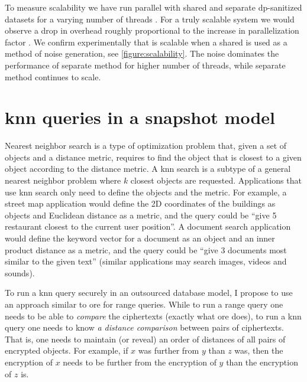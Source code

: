 				To measure scalability we have run parallel \epsolute{} with shared and separate \acrshort{dp}-sanitized datasets \serverDS{} for a varying number of threads \oramsNumber{}.
				For a truly scalable system we would observe a drop in overhead roughly proportional to the increase in parallelization factor \oramsNumber{}.
				We confirm experimentally that \epsolute{} is scalable when a shared \serverDS{} is used as a method of noise generation, see \cref{figure:scalability}.
				The noise dominates the performance of separate \serverDS{} method for higher number of threads, while separate \serverDS{} method continues to scale.

				

	\section{\acrshort{knn} queries in a snapshot model}

		Nearest neighbor search is a type of optimization problem that, given a set of objects and a distance metric, requires to find the object that is closest to a given object according to the distance metric.
		A \acrfull{knn} search is a subtype of a general nearest neighbor problem where $k$ closest objects are requested.
		Applications that use \acrshort{knn} search only need to define the objects and the metric.
		For example, a street map application would define the 2D coordinates of the buildings as objects and Euclidean distance as a metric, and the query could be ``give 5 restaurant closest to the current user position''.
		A document search application would define the keyword vector for a document as an object and an inner product distance as a metric, and the query could be ``give 3 documents most similar to the given text'' (similar applications may search images, videos and sounds).

		To run a \acrshort{knn} query securely in an outsourced database model, I propose to use an approach similar to \acrshort{ore} for range queries.
		While to run a range query one needs to be able to \emph{compare} the ciphertexts (exactly what \acrshort{ore} does), to run a \acrshort{knn} query one needs to know \emph{a distance comparison} between pairs of ciphertexts.
		That is, one needs to maintain (or reveal) an order of distances of all pairs of encrypted objects.
		For example, if $x$ was further from $y$ than $z$ was, then the encryption of $x$ needs to be further from the encryption of $y$ than the encryption of $z$ is.

